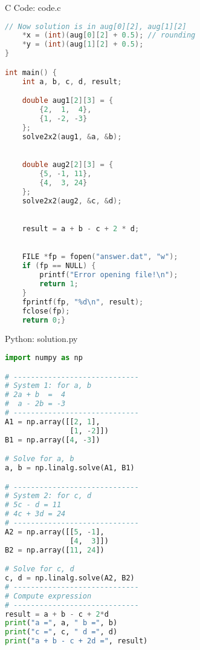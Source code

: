 \documentclass{beamer}
\numberwithin{equation}{section}
\theoremstyle{remark}
\begin{document}
\begin{frame}[fragile]{C Code: code.c}
\begin{lstlisting}[language=C]
    // Now solution is in aug[0][2], aug[1][2]
    *x = (int)(aug[0][2] + 0.5); // rounding
    *y = (int)(aug[1][2] + 0.5);
}

int main() {
    int a, b, c, d, result;

    double aug1[2][3] = {
        {2,  1,  4},
        {1, -2, -3}
    };
    solve2x2(aug1, &a, &b);

    
    double aug2[2][3] = {
        {5, -1, 11},
        {4,  3, 24}
    };
    solve2x2(aug2, &c, &d);

    
    result = a + b - c + 2 * d;

  
    FILE *fp = fopen("answer.dat", "w");
    if (fp == NULL) {
        printf("Error opening file!\n");
        return 1;
    }
    fprintf(fp, "%d\n", result);
    fclose(fp);
    return 0;}
\end{lstlisting}
\end{frame}

\begin{frame}[fragile]{Python: solution.py}
\begin{lstlisting}[language=Python]
import numpy as np

# -----------------------------
# System 1: for a, b
# 2a + b  =  4
#  a - 2b = -3
# -----------------------------
A1 = np.array([[2, 1],
               [1, -2]])
B1 = np.array([4, -3])

# Solve for a, b
a, b = np.linalg.solve(A1, B1)

# -----------------------------
# System 2: for c, d
# 5c - d = 11
# 4c + 3d = 24
# -----------------------------
A2 = np.array([[5, -1],
               [4,  3]])
B2 = np.array([11, 24])

# Solve for c, d
c, d = np.linalg.solve(A2, B2)
# -----------------------------
# Compute expression
# -----------------------------
result = a + b - c + 2*d
print("a =", a, " b =", b)
print("c =", c, " d =", d)
print("a + b - c + 2d =", result)

\end{lstlisting}
\end{frame} 
\end{document}

